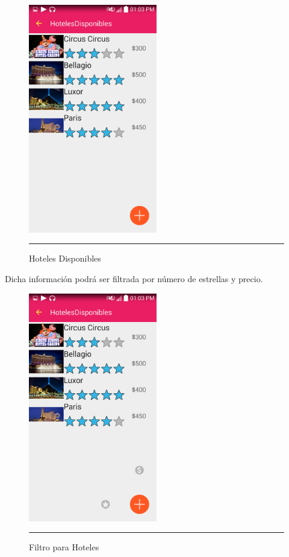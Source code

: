 \begin{figure}[h]
	\centering
		\includegraphics[width=0.5\textwidth]{Figuras/hotelesdisponibles.png}
		\rule{30em}{0.5pt}
	\caption[Hoteles Disponibles]{Hoteles Disponibles}
	\label{fig:hotelesDisponibles}
\end{figure}

Dicha información podrá ser filtrada por número de estrellas y precio.

\begin{figure}[h]
	\centering
		\includegraphics[width=0.5\textwidth]{Figuras/filtrohoteles.png}
		\rule{30em}{0.5pt}
	\caption[Filtro para Hoteles]{Filtro para Hoteles}
	\label{fig:filtroHoteles}
\end{figure}
\clearpage


